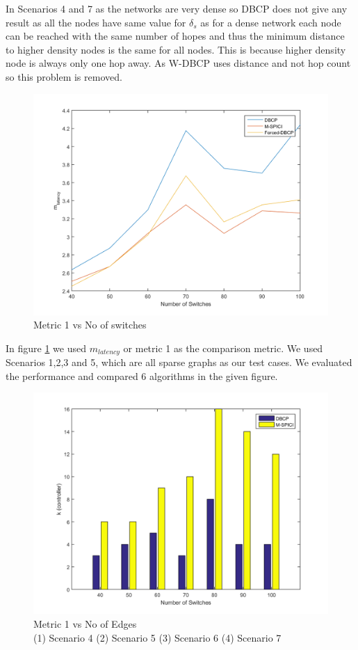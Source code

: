 \documentclass[10pt]{extarticle}
\begin{document}
	In Scenarios 4 and 7 as the networks are very dense so DBCP does not give any result as all the nodes have same value for $\delta_s$ as for a dense network each node can be reached with the same number of hopes and thus the minimum distance to higher density nodes is the same for all nodes. This is because higher density node is always only one hop away. As W-DBCP uses distance and not hop count so this problem is removed.
	
	\begin{figure}
		\includegraphics[width=\linewidth]{newgraph.png}
		\caption{Metric 1 vs No of switches}
		\label{fig:newgraph}
	\end{figure}

	In figure \ref{fig:newgraph} we used $m_{latency}$ or metric 1 as the comparison metric. We used Scenarios 1,2,3 and 5, which are all sparse graphs as our test cases. We evaluated the performance and compared 6 algorithms in the given figure.
	
	\begin{figure}
		\includegraphics[width=\linewidth]{newbar.png}
		\caption{Metric 1 vs No of Edges \\ (1) Scenario 4  (2) Scenario 5  (3) Scenario 6  (4) Scenario 7}
		\label{fig:newbar}
	\end{figure}
	
\end{document}
